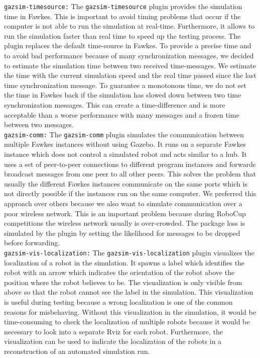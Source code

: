 \texttt{gazsim-timesource:}
The \texttt{gazsim-timesource} plugin provides the simulation time in Fawkes. This is important to avoid timing problems that occur if the computer is not able to run the simulation at real-time. Furthermore, it allows to run the simulation faster than real time to speed up the testing process. The plugin replaces the default time-source in Fawkes. To provide a precise time and to avoid bad performance because of many synchronization messages, we decided to estimate the simulation time between two received time-messages. We estimate the time with the current simulation speed and the real time passed since the last time synchronization message. To guarantee a monotonous time, we do not set the time in Fawkes back if the simulation has slowed down between two time synchronization messages. This can create a time-difference and is more acceptable than a worse performance with many messages and a frozen time between two messages.
\\

\texttt{gazsim-comm:}
The \texttt{gazsim-comm} plugin simulates the communication between multiple Fawkes instances without using Gazebo. It runs on a separate Fawkes instance which does not control a simulated robot and acts similar to a hub. It uses a set of peer-to-peer connections to different program instances and forwards broadcast messages from one peer to all other peers. This solves the problem that usually the different Fawkes instances communicate on the same ports which is not directly possible if the instances run on the same computer. We preferred this approach over others because we also want to simulate communication over a poor wireless network. This is an important problem because during RoboCup competitions the wireless network usually is over-crowded. The package loss is simulated by the plugin by setting the likelihood for messages to be dropped before forwarding.
\\

\texttt{gazsim-vis-localization:}
The \texttt{gazsim-vis-localization} plugin visualizes the localization of a robot in the simulation. It spawns a label which identifies the robot with an arrow which indicates the orientation of the robot above the position where the robot believes to be. The visualization is only visible from above so that the robot cannot see the label in the simulation. This visualization is useful during testing because a wrong localization is one of the common reasons for misbehaving. Without this visualization in the simulation, it would be time-consuming to check the localization of multiple robots because it would be necessary to look into a separate Rviz for each robot. Furthermore, the visualization can be used to indicate the localization of the robots in a reconstruction of an automated simulation run.
\\



